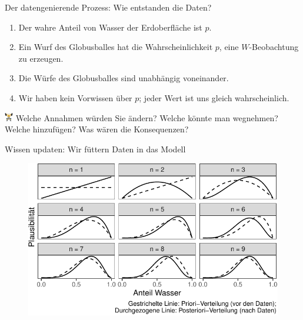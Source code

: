 \documentclass[
  ngerman,
  ignorenonframetext,
]{beamer}
\providecommand{\tightlist}{%
  \setlength{\itemsep}{0pt}\setlength{\parskip}{0pt}}
\begin{document}
\begin{frame}{Der datengenierende Prozess: Wie entstanden die Daten?}
\protect\hypertarget{der-datengenierende-prozess-wie-entstanden-die-daten}{}
\begin{enumerate}
\tightlist
\item
  Der wahre Anteil von Wasser der Erdoberfläche ist \(p\).
\item
  Ein Wurf des Globusballes hat die Wahrscheinlichkeit \(p\), eine
  \(W\)-Beobachtung zu erzeugen.
\item
  Die Würfe des Globusballes sind unabhängig voneinander.
\item
  Wir haben kein Vorwissen über \(p\); jeder Wert ist uns gleich
  wahrscheinlich.
\end{enumerate}

\includegraphics[width=1em]{../img/weight.pdf} Welche Annahmen würden
Sie ändern? Welche könnte man wegnehmen? Welche hinzufügen? Was wären
die Konsequenzen?
\end{frame}

\begin{frame}{Wissen updaten: Wir füttern Daten in das Modell}
\protect\hypertarget{wissen-updaten-wir-fuxfcttern-daten-in-das-modell}{}
\begin{figure}[H]
\includegraphics[width=1\linewidth]{unnamed-chunk-19-1} \end{figure}
\end{frame}
\end{document}
